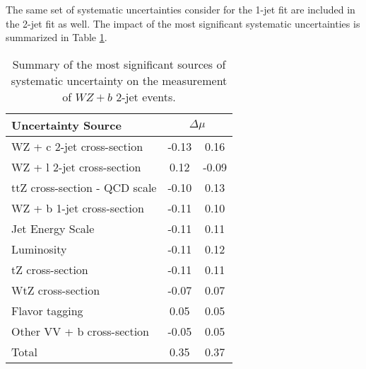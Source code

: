 


The same set of systematic uncertainties consider for the 1-jet fit are included in the 2-jet fit as well. The impact of the most significant systematic uncertainties is summarized in Table \ref{tab:systematics_2j}. 

\begin{table}[H]
    \centering
    \begin{tabular}{l|cc}
        \hline\hline
        Uncertainty Source & \multicolumn{2}{c}{$\Delta \mu$ }  \\
        \hline
        WZ + c 2-jet cross-section & -0.13 & 0.16 \\
        WZ + l 2-jet cross-section & 0.12 & -0.09 \\
        ttZ cross-section - QCD scale & -0.10 & 0.13 \\
        WZ + b 1-jet cross-section & -0.11 & 0.10 \\
        Jet Energy Scale & -0.11 & 0.11 \\
        Luminosity & -0.11 & 0.12 \\
        tZ cross-section & -0.11 & 0.11 \\
        WtZ cross-section & -0.07 & 0.07 \\
        Flavor tagging  & 0.05 & 0.05 \\
        Other VV + b cross-section & -0.05 & 0.05 \\
        \hline
        Total & 0.35 & 0.37 \\
        \hline\hline
    \end{tabular}
    \caption{Summary of the most significant sources of systematic uncertainty on the measurement of $WZ+b$ 2-jet events.}
    \label{tab:systematics_2j}
\end{table}

